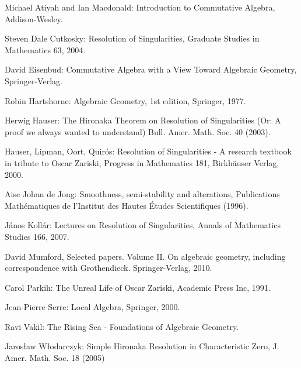 \documentclass[12pt,a4paper,leqno]{article}
\theoremstyle{plain}
\theoremstyle{definition}
\theoremstyle{remark}
\begin{document}
\begin{thebibliography}{5, style=alpha}

Michael Atiyah and Ian Macdonald: Introduction to Commutative Algebra, Addison-Wesley.

Steven Dale Cutkosky: Resolution of Singularities, Graduate Studies in Mathematics 63, 2004.

David Eisenbud: Commutative Algebra with a View Toward Algebraic Geometry, Springer-Verlag.

Robin Hartshorne: Algebraic Geometry, 1st edition, Springer, 1977.

Herwig Hauser: The Hironaka Theorem on Resolution of Singularities (Or: A proof we always wanted to understand) Bull. Amer. Math. Soc. 40 (2003).

Hauser, Lipman, Oort, Quirós: Resolution of Singularities - A research textbook in tribute to Oscar Zariski, Progress in Mathematics 181, Birkhäuser Verlag, 2000.

Aise Johan de Jong: Smoothness, semi-stability and alterations, Publications Mathématiques de l’Institut des Hautes Études Scientifiques (1996).

János Kollár: Lectures on Resolution of Singularities, Annals of Mathematics Studies 166, 2007.

David Mumford, Selected papers. Volume II. On algebraic geometry, including correspondence with Grothendieck. Springer-Verlag, 2010.

 Carol Parkih: The Unreal Life of Oscar Zariski, Academic Press Inc, 1991.

Jean-Pierre Serre: Local Algebra, Springer, 2000.

Ravi Vakil: The Rising Sea - Foundations of Algebraic Geometry.

Jaros\l{}aw W\l{}odarczyk: Simple Hironaka Resolution in Characteristic Zero, J. Amer. Math. Soc. 18 (2005)
\end{thebibliography}
\end{document}

